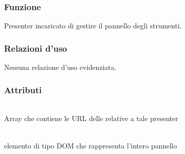 
\subsubsection*{Funzione}
Presenter incaricato di gestire il pannello degli strumenti.

\subsubsection*{Relazioni d'uso}
Nessuna relazione d'uso evidenziata.

\subsubsection*{Attributi}
\begin{description}
\item{}\\
Array che contiene le URL delle  relative a tale presenter
\item{}\\
elemento di tipo DOM che rappresenta l'intero pannello
\end{description}

